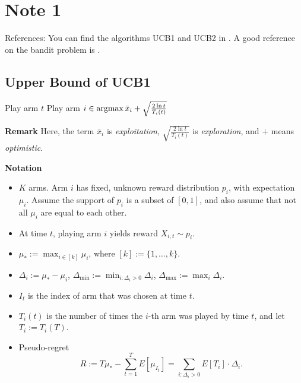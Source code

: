 \section{Note 1}

References: You can find the algorithms UCB1 and UCB2 in \cite{Auer2002}.
A good reference on the bandit problem is \cite{MAL024}.

\subsection{Upper Bound of UCB1} %

\begin{alg}[UCB1] \leavevmode
    \begin{framed}
        \begin{algorithmic}
                \State Play arm $t$
            \EndFor
                \State Play arm $i\in\mathop{\mathrm{argmax}} \bar x_i + \sqrt{\frac{2\ln t}{T_i(t)}}$
            \EndFor
        \end{algorithmic}
    \end{framed}
\end{alg}

\textbf{Remark}
Here,
the term $\bar x_i$ is \emph{exploitation},
$\sqrt{\frac{2\ln t}{T_i(t)}}$ is \emph{exploration},
and $+$ means \emph{optimistic}.

\textbf{Notation}
\begin{itemize}
    \item $K$ arms.
        Arm $i$ has fixed, unknown reward distribution $p_i$,
        with expectation $\mu_i$.
        Assume the support of $p_i$ is a subset of $[0,1]$, and
        also assume that not all $\mu_i$ are equal to each other.
    \item At time $t$, playing arm $i$ yields reward $X_{i,t}\sim p_i$.
    \item $\mu_*:=\max_{i\in[k]}\mu_i$, where $[k]:=\{1,\dots,k\}$.
    \item $\Delta_i:=\mu_* - \mu_i$,
        $\Delta_{\text{min}}:=\min_{i:\Delta_i>0}\Delta_i$,
        $\Delta_{\text{max}}:=\max_i \Delta_i$.
    \item $I_t$ is the index of arm that was chosen at time $t$.
    \item $T_i(t)$ is the number of times the $i$-th arm was played by time $t$,
        and let $T_i:=T_i(T)$.
    \item Pseudo-regret
        \begin{equation}
            R:=T\mu_*-\sum_{t=1}^T E[\mu_{I_t}]
            = \sum_{i:\Delta_i>0} E[T_i]\cdot\Delta_i.
        \end{equation}
\end{itemize}

